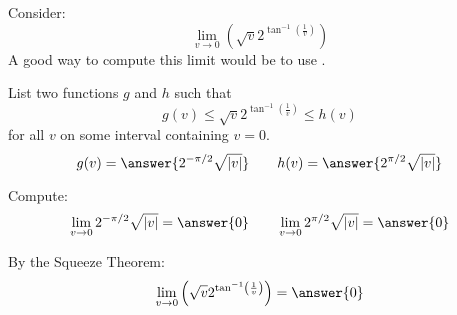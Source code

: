 \documentclass{ximera}
\author{Bart Snapp}
\begin{document}
\begin{exercise}


Consider:
\[
\lim_{v\to 0} \left(\sqrt{v} 2^{\tan ^{-1}\left(\frac{1}{v}\right)}\right)
\]
A good way to compute this limit would be to use .
\begin{exercise}
List two functions $g$ and $h$ such that
\[
g(v)\le \sqrt{v} 2^{\tan ^{-1}\left(\frac{1}{v}\right)} \le h(v)
\]
for all $v$ on some interval containing $v=0$.
\[
g(v)=\answer{2^{-\pi /2} \sqrt{\left| v\right| }}\qquad h(v) =\answer{2^{\pi /2} \sqrt{\left| v\right| }}
\]
\begin{exercise}
Compute:
\[
\lim_{v \to 0}2^{-\pi /2} \sqrt{\left| v\right| } = \answer{0}\qquad \lim_{v\to 0}2^{\pi /2} \sqrt{\left| v\right| } = \answer{0}
\]
\begin{exercise}
By the Squeeze Theorem:
\[
\lim_{v\to 0} \left(\sqrt{v} 2^{\tan ^{-1}\left(\frac{1}{v}\right)}\right) = \answer{0}
\]
\end{exercise}
\end{exercise}
\end{exercise}
\end{exercise}
\end{document}
